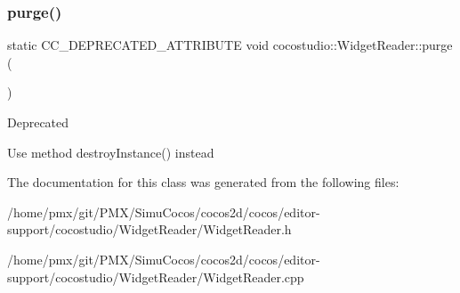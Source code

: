 \subsubsection{\texorpdfstring{purge()}{purge()}\hspace{0.1cm}{\footnotesize\ttfamily [2/2]}}
{\footnotesize\ttfamily static C\+C\+\_\+\+D\+E\+P\+R\+E\+C\+A\+T\+E\+D\+\_\+\+A\+T\+T\+R\+I\+B\+U\+TE void cocostudio\+::\+Widget\+Reader\+::purge (\begin{DoxyParamCaption}{ }\end{DoxyParamCaption})\hspace{0.3cm}{\ttfamily [static]}}

\begin{DoxyRefDesc}{Deprecated}
\item[\hyperlink{deprecated__deprecated000347}{Deprecated}]Use method destroy\+Instance() instead \end{DoxyRefDesc}


The documentation for this class was generated from the following files\+:\begin{DoxyCompactItemize}
\item 
/home/pmx/git/\+P\+M\+X/\+Simu\+Cocos/cocos2d/cocos/editor-\/support/cocostudio/\+Widget\+Reader/Widget\+Reader.\+h\item 
/home/pmx/git/\+P\+M\+X/\+Simu\+Cocos/cocos2d/cocos/editor-\/support/cocostudio/\+Widget\+Reader/Widget\+Reader.\+cpp\end{DoxyCompactItemize}
